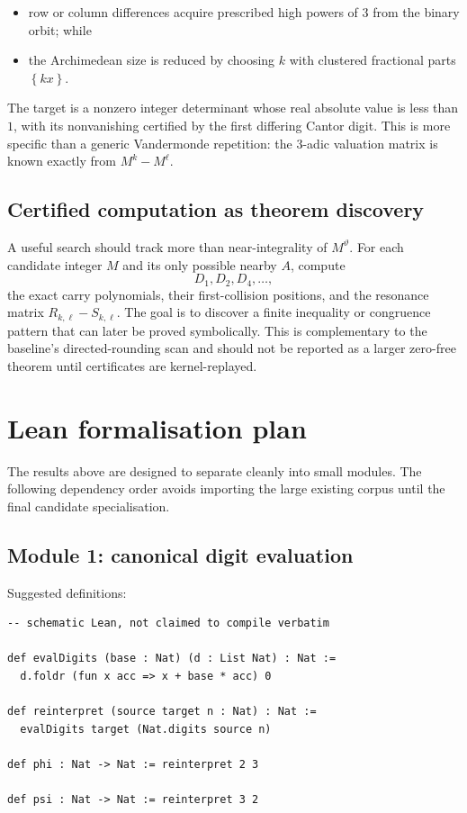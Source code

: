\documentclass[11pt]{article}
\theoremstyle{definition}
\theoremstyle{remark}
\newcommand{\fracpart}[1]{\left\{#1\right\}}
\newcommand{\thetaAE}{\vartheta}
\begin{document}
\begin{itemize}
\item row or column differences acquire prescribed high powers of $3$ from
the binary orbit; while
\item the Archimedean size is reduced by choosing $k$ with clustered
fractional parts $\fracpart{kx}$.
\end{itemize}

The target is a nonzero integer determinant whose real absolute value is less
than $1$, with its nonvanishing certified by the first differing Cantor digit.
This is more specific than a generic Vandermonde repetition: the $3$-adic
valuation matrix is known exactly from $M^k-M^\ell$.

\subsection{Certified computation as theorem discovery}

A useful search should track more than near-integrality of $M^{\thetaAE}$.
For each candidate integer $M$ and its only possible nearby $A$, compute
\[
  D_1,D_2,D_4,\ldots,
\]
the exact carry polynomials, their first-collision positions, and the
resonance matrix $R_{k,\ell}-S_{k,\ell}$.  The goal is to discover a finite
inequality or congruence pattern that can later be proved symbolically.  This
is complementary to the baseline's directed-rounding scan and should not be
reported as a larger zero-free theorem until certificates are kernel-replayed.

\section{Lean formalisation plan}

The results above are designed to separate cleanly into small modules.  The
following dependency order avoids importing the large existing corpus until
the final candidate specialisation.

\subsection{Module 1: canonical digit evaluation}

Suggested definitions:

\begin{lstlisting}[language={}] 
-- schematic Lean, not claimed to compile verbatim

def evalDigits (base : Nat) (d : List Nat) : Nat :=
  d.foldr (fun x acc => x + base * acc) 0

def reinterpret (source target n : Nat) : Nat :=
  evalDigits target (Nat.digits source n)

def phi : Nat -> Nat := reinterpret 2 3

def psi : Nat -> Nat := reinterpret 3 2
\end{lstlisting}
\end{document}

